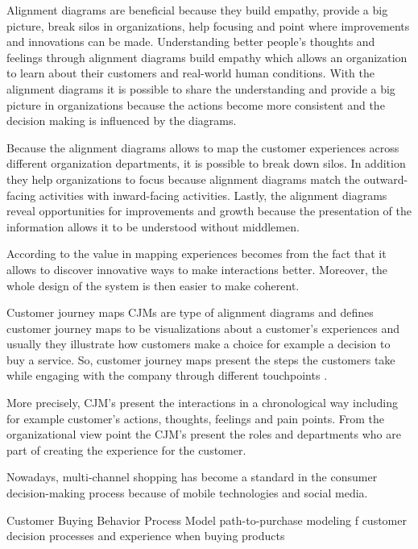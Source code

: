 Alignment diagrams are beneficial because they build empathy, provide a big picture, break silos in organizations, help focusing and point where improvements and innovations can be made. Understanding better people's thoughts and feelings through alignment diagrams build empathy which allows an organization to learn about their customers and real-world human conditions. With the alignment diagrams it is possible to share the understanding and provide a big picture in organizations because the actions become more consistent and the decision making is influenced by the diagrams. \parencite{Kalbach:2016}

Because the alignment diagrams allows to map the customer experiences across different organization departments, it is possible to break down silos. In addition they help organizations to focus because alignment diagrams match the outward-facing activities with inward-facing activities. Lastly, the alignment diagrams reveal opportunities for improvements and growth because the presentation of the information allows it to be understood without middlemen. \parencite{Kalbach:2016}

According to \textcite{Kalbach:2016} the value in mapping experiences becomes from the fact that it allows to discover innovative ways to make interactions better. Moreover, the whole design of the system is then easier to make coherent.

Customer journey maps CJMs are type of alignment diagrams and \textcite{Kalbach:2016} defines customer journey maps to be visualizations about a customer's experiences and usually they illustrate how customers make a choice for example a decision to buy a service. So, customer journey maps present the steps the customers take while engaging with the company through different touchpoints \parencite{Richardson:2010}.

More precisely, CJM's present the interactions in a chronological way including for example customer's actions, thoughts, feelings and pain points. From the organizational view point the CJM's present the roles and departments who are part of creating the experience for the customer. \parencite{Kalbach:2016}

Nowadays, multi-channel shopping has become a standard in the consumer decision-making process because of mobile technologies and social media. 

Customer Buying Behavior Process Model
path-to-purchase modeling
f customer decision processes and
experience when buying products








